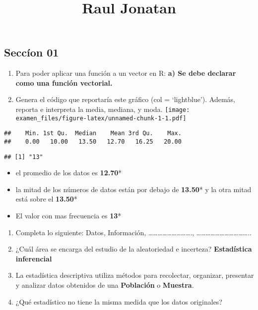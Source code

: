 \documentclass[]{article}
\title{Raul Jonatan}
\author{}
\date{\vspace{-2.5em}}
\providecommand{\tightlist}{%
  \setlength{\itemsep}{0pt}\setlength{\parskip}{0pt}}
\begin{document}
\maketitle

\hypertarget{seccuxedon-01}{%
\subsection{Seccíon 01}\label{seccuxedon-01}}

\begin{enumerate}
\def\labelenumi{\arabic{enumi}.}
\tightlist
\item
  Para poder aplicar una función a un vector en R: \textbf{a) Se debe
  declarar como una función vectorial.}
\item
  Genera el código que reportaría este gráfico (col = `lightblue').
  Además, reporta e interpreta la media, mediana, y moda.
  \texttt{[image: examen\_files/figure-latex/unnamed-chunk-1-1.pdf]}
\end{enumerate}

\begin{verbatim}
##    Min. 1st Qu.  Median    Mean 3rd Qu.    Max. 
##    0.00   10.00   13.50   12.70   16.25   20.00
\end{verbatim}

\begin{verbatim}
## [1] "13"
\end{verbatim}

\begin{itemize}
\tightlist
\item
  el promedio de los datos es \textbf{12.70}*
\item
  la mitad de los números de datos están por debajo de \textbf{13.50}* y
  la otra mitad está sobre el \textbf{13.50}*
\item
  El valor con mas frecuencia es \textbf{13}*
\end{itemize}

\begin{enumerate}
\def\labelenumi{\arabic{enumi}.}
\setcounter{enumi}{2}
\item
  Completa lo siguiente: Datos, Información,
  \ldots{}\ldots{}\ldots{}\ldots{}\ldots{}\ldots{}\ldots{}\ldots{}\ldots{}.,
  \ldots{}\ldots{}\ldots{}\ldots{}\ldots{}\ldots{}\ldots{}\ldots{}\ldots{}\ldots{}\ldots{}..
\item
  ¿Cuál área se encarga del estudio de la aleatoriedad e incerteza?
  \textbf{Estadística inferencial}
\item
  La estadística descriptiva utiliza métodos para recolectar, organizar,
  presentar y analizar datos obtenidos de una \textbf{Población} o
  \textbf{Muestra}.
\item
  ¿Qué estadístico no tiene la misma medida que los datos originales?
\end{enumerate}
\end{document}
